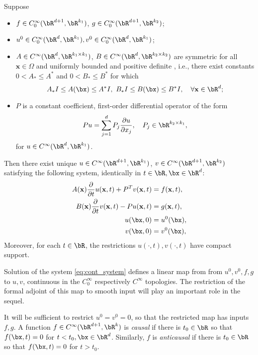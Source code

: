 \begin{theorem}
\label{thm:well-posed}
Suppose
\begin{itemize}  
\item $f \in C_0^{\infty}(\bR^{d+1},\bR^{k_1})$, $g \in
  C_0^{\infty}(\bR^{d+1},\bR^{k_2})$;
\item $u^0 \in C_0^{\infty}(\bR^d,\bR^{k_1}), v^0 \in C_0^{\infty}(\bR^d,\bR^{k_1})$;
\item $A \in C^{\infty}(\bR^d, \bR^{k_1 \times k_1})$, $B \in
  C^{\infty}(\bR^d, \bR^{k_2 \times k_2})$ are symmetric for all $\mathbf x\in\Omega$ 
  and uniformly bounded and positive definite , i.e., there exist constants 
  $0< A_*\le A^*$ and $0< B_*\le B^*$ for which
  \[
    A_*I \le A(\bx) \le A^*I,\,\,   B_*I \le B(\bx) \le B^*I, \quad \forall \mathbf
    x\in \bR^d;
  \]
  
\item $P$ is a constant coefficient, 
  first-order differential operator of the form
  \[
    Pu = \sum_{j=1}^d P_j \frac{\partial u}{\partial x_j}, \quad P_j\in \bR^{k_2\times k_1},
  \]
  for $u\in C^{\infty}(\bR^d,\bR^{k_1})$.
\end{itemize}
Then there exist unique $u \in C^{\infty}(\bR^{d+1},\bR^{k_1})$, $v \in
  C^{\infty}(\bR^{d+1},\bR^{k_2})$ satisfying the following system,
  identically in  $t \in \bR, \bx \in \bR^d$:
\begin{equation}\label{eq:cont_system}
\begin{split}
	A(\mathbf x)\frac{\partial}{\partial t}u(\mathbf x,t) + P^T v(\mathbf x,t) 
		&= f(\mathbf x,t), \\
	B(\mathbf x)\frac{\partial}{\partial t}v(\mathbf x,t) - Pu(\mathbf x,t) 
		&= g(\mathbf x,t), \\
        u(\bx,0) & = u^0(\bx),\\
        v(\bx,0) & = v^0(\bx), 
\end{split}
\end{equation}
Moreover, for each $t \in \bR$, the restrictions $u(\cdot,t), v(\cdot,t)$ have compact support.
\end{theorem}

Solution of the system \ref{eq:cont_system} defines a linear map from from
$u^0,v^0,f,g$ to $u,v$, continuous in the $C_0^{\infty}$ respectively
$C^{\infty} $ topologies. The restriction of the formal adjoint of
this map to smooth input will play an important role in the sequel. 

It will be sufficient to restrict $u^0=v^0=0$, so that the restricted map
has inputs $f,g$. A function $f \in C^{\infty}(\bR^{d+1},\bR^k)$ is {\em causal} if there 
is $t_0 \in \bR$ so that $f(\bx,t)=0$ for $t<t_0, \bx \in
\bR^d$. Similarly, $f$ is {\em anticausal} if there is $t_0 \in \bR$
so that $f(\bx,t)=0$ for $t>t_0$.

